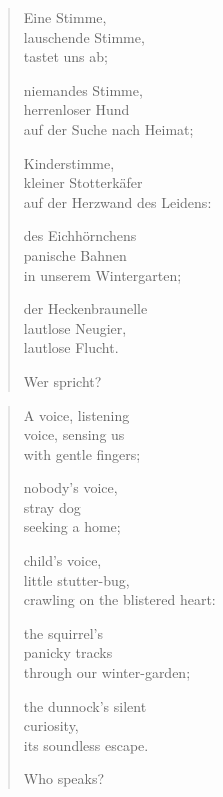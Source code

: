 
\cleartorecto


\begin{verse}
Eine Stimme,\\
lauschende Stimme,\\
tastet uns ab;

niemandes Stimme,\\
herrenloser Hund\\
auf der Suche nach Heimat;

Kinderstimme,\\
kleiner Stotterkäfer\\
auf der Herzwand des Leidens:

des Eichhörnchens\\
panische Bahnen\\
in unserem Wintergarten;

der Heckenbraunelle\\
lautlose Neugier,\\
lautlose Flucht.

Wer spricht?
\end{verse}

\cleartoverso


\begin{verse}
A voice, listening\\
voice, sensing us\\
with gentle fingers;

nobody's voice,\\
stray dog\\
seeking a home;

child's voice,\\
little stutter-bug,\\
crawling on the blistered heart:

the squirrel's\\
panicky tracks\\
through our winter-garden;

the dunnock's silent\\
curiosity,\\
its soundless escape.

Who speaks?
\end{verse}
